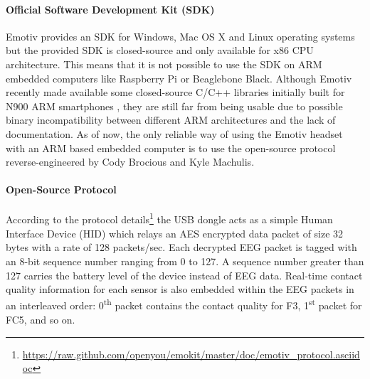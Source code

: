\documentclass[12pt]{article}
\newcommand\mysubsubsubsection[1]{\paragraph{#1}\hspace{0pt}}
\numberwithin{equation}{section}
\numberwithin{figure}{section}
\numberwithin{table}{section}
\begin{document}
\mysubsubsubsection{Official Software Development Kit (SDK)}

\par{
    Emotiv provides an SDK for Windows, Mac OS X and Linux operating systems but the provided SDK is
    closed-source and only available for x86 CPU architecture. This means that it is not possible
    to use the SDK on ARM embedded computers like Raspberry Pi or Beaglebone Black.
    Although Emotiv recently made available some closed-source C/C++ libraries initially
    built for N900 ARM smartphones \citep{stopczynski_smartphone_2011}, they are still far from being usable due to possible binary
    incompatibility between different ARM architectures and the lack of documentation. As of now,
    the only reliable way of using the Emotiv headset with an ARM based embedded computer is to use the
    open-source protocol reverse-engineered by Cody Brocious and Kyle Machulis.
}

\mysubsubsubsection{Open-Source Protocol}

\par{
    According to the protocol details\footnote{\url{https://raw.github.com/openyou/emokit/master/doc/emotiv_protocol.asciidoc}}
    the USB dongle acts as a simple Human Interface Device (HID) which relays an AES encrypted data packet of size 32 bytes with a rate of 128 packets/sec.
    Each decrypted EEG packet is tagged with an 8-bit sequence number ranging from 0 to 127.
    A sequence number greater than 127 carries the battery level of the device instead of EEG data.
    Real-time contact quality information for each sensor is also embedded within the EEG
    packets in an interleaved order: 0\textsuperscript{th} packet contains the contact quality for F3,
    1\textsuperscript{st} packet for FC5, and so on.
}
\end{document}
